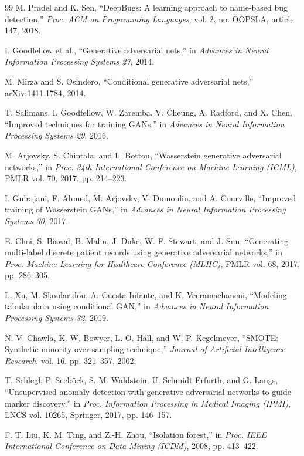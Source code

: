 \begin{thebibliography}{99}
M. Pradel and K. Sen,
``DeepBugs: A learning approach to name-based bug detection,''
\textit{Proc. ACM on Programming Languages}, vol. 2, no. OOPSLA, article 147, 2018.

I. Goodfellow et al.,
``Generative adversarial nets,''
in \textit{Advances in Neural Information Processing Systems 27}, 2014.

M. Mirza and S. Osindero,
``Conditional generative adversarial nets,''
arXiv:1411.1784, 2014.

T. Salimans, I. Goodfellow, W. Zaremba, V. Cheung, A. Radford, and X. Chen,
``Improved techniques for training GANs,''
in \textit{Advances in Neural Information Processing Systems 29}, 2016.

M. Arjovsky, S. Chintala, and L. Bottou,
``Wasserstein generative adversarial networks,''
in \textit{Proc. 34th International Conference on Machine Learning (ICML)}, PMLR vol. 70, 2017, pp. 214--223.

I. Gulrajani, F. Ahmed, M. Arjovsky, V. Dumoulin, and A. Courville,
``Improved training of Wasserstein GANs,''
in \textit{Advances in Neural Information Processing Systems 30}, 2017.

E. Choi, S. Biswal, B. Malin, J. Duke, W. F. Stewart, and J. Sun,
``Generating multi-label discrete patient records using generative adversarial networks,''
in \textit{Proc. Machine Learning for Healthcare Conference (MLHC)}, PMLR vol. 68, 2017, pp. 286--305.

L. Xu, M. Skoularidou, A. Cuesta-Infante, and K. Veeramachaneni,
``Modeling tabular data using conditional GAN,''
in \textit{Advances in Neural Information Processing Systems 32}, 2019.

N. V. Chawla, K. W. Bowyer, L. O. Hall, and W. P. Kegelmeyer,
``SMOTE: Synthetic minority over-sampling technique,''
\textit{Journal of Artificial Intelligence Research}, vol. 16, pp. 321--357, 2002.

T. Schlegl, P. Seeb\"ock, S. M. Waldstein, U. Schmidt-Erfurth, and G. Langs,
``Unsupervised anomaly detection with generative adversarial networks to guide marker discovery,''
in \textit{Proc. Information Processing in Medical Imaging (IPMI)}, LNCS vol. 10265, Springer, 2017, pp. 146--157.

F. T. Liu, K. M. Ting, and Z.-H. Zhou,
``Isolation forest,''
in \textit{Proc. IEEE International Conference on Data Mining (ICDM)}, 2008, pp. 413--422.


\end{thebibliography}
